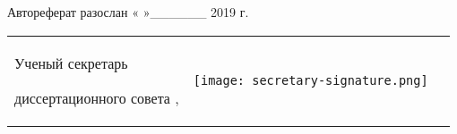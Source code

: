 \vspace{0.004\paperheight}


Автореферат разослан «   »\_\_\_\_\_\_ 2019 г.


\vspace{0.008\paperheight plus1fill}
\noindent%
\begin{tabularx}{\textwidth}{@{}%
>{\raggedright\arraybackslash}b{18em}@{}
>{\centering\arraybackslash}X
r
@{}}
    Ученый секретарь\par
    диссертационного совета
    ,\par
    &
    \texttt{[image: secretary-signature.png]}
    &
\end{tabularx}
